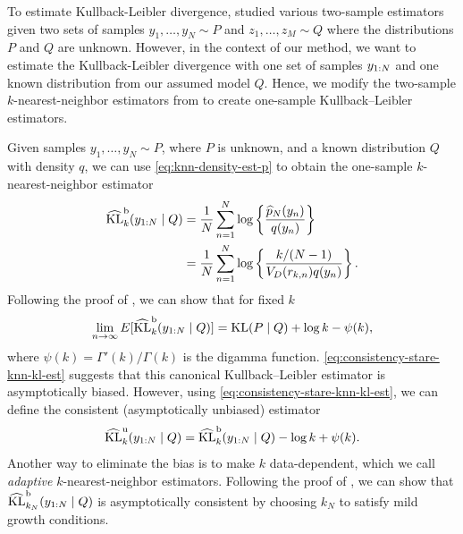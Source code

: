 To estimate Kullback-Leibler divergence, \citet{Wang:2009} studied various two-sample estimators given two sets of samples $y_{1},\dots, y_{N} \sim P$ and $z_{1},\dots,z_{M} \sim Q$ where the distributions $P$ and $Q$ are unknown.
However, in the context of our method, we want to estimate the Kullback-Leibler divergence with one set of samples $y_{1:N}$ and one known distribution from our assumed model $Q$.
Hence, we modify the two-sample $k$-nearest-neighbor estimators from \citep{Wang:2009} to
create one-sample Kullback--Leibler estimators.

Given samples $y_{1},\dots, y_{N} \sim P$, where $P$ is unknown, and a known distribution $Q$ with density $q$,
we can use \cref{eq:knn-density-est-p} to obtain the one-sample $k$-nearest-neighbor estimator
\begin{equation}
	\begin{aligned}
		\klestsub{b}{k}{y_{1:\numobs}}{Q}
		 & = \frac{1}{\numobs}\sum_{n=1}^{\numobs}\log\left\{\frac{\widehat{p}_{\numobs}(y_n)}{q(y_n)}\right\}   \\
		 & = \frac{1}{N}\sum_{n=1}^{\numobs} \log\left\{\frac{k/(\numobs-1)}{V_{D}(r_{k,n}) q(y_n)}\right\}.
		\label{eq:canonical-knn-kl-est}
	\end{aligned}
\end{equation}
Following the proof of \citet[Theorem 1]{Wang:2009}, we can show that for fixed $k$
\begin{equation}
	\lim\limits_{n\rightarrow\infty}E[\klestsub{b}{k}{y_{1:\numobs}}{Q}] = \kl{P}{Q} +\log k- \psi(k),
	\label{eq:consistency-stare-knn-kl-est}
\end{equation}
where $\psi(k) = \Gamma'(k)/\Gamma(k)$ is the digamma function. \cref{eq:consistency-stare-knn-kl-est} suggests that this canonical Kullback--Leibler estimator is asymptotically biased.
However, using \cref{eq:consistency-stare-knn-kl-est}, we can define the consistent (asymptotically unbiased) estimator
\begin{equation}
	\klestsub{u}{k}{y_{1:\numobs}}{Q} = \klestsub{b}{k}{y_{1:\numobs}}{Q} - \log k + \psi(k).
	\label{eq:biased-correct-knn-kl-est}
\end{equation}
Another way to eliminate the bias is to make $k$ data-dependent, which we call \emph{adaptive} $k$-nearest-neighbor estimators.
Following the proof of \citet[Theorem 5]{Wang:2009}, we can show that $\mathrm{\widehat{KL}^{b}}_{k_{N}}(y_{1:N} \mid Q)$ is asymptotically consistent by choosing $k_{N}$ to satisfy mild growth conditions.
